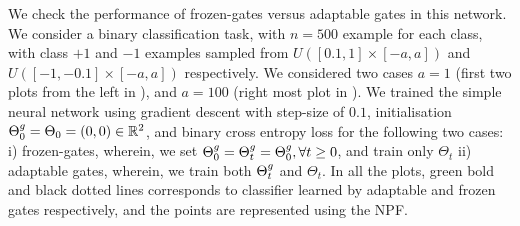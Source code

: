 We check the performance of frozen-gates versus adaptable gates in this network. We consider a binary classification task, with $n=500$ example for each class, with class $+1$ and $-1$ examples sampled from $U([0.1,1]\times [-a,a])$ and $U([-1,-0.1]\times[-a,a])$ respectively. We considered two cases $a=1$ (first two plots from the left in ), and $a=100$ (right most plot in ). 
We trained the simple neural network using gradient descent with step-size of $0.1$, initialisation ${\Theta}^g_0=\Theta_0=(0,0)\in\mathbb{R}^2$, and binary cross entropy loss for the following two cases: i) frozen-gates, wherein, we set ${\Theta}^g_0={\Theta}^g_t={\Theta}^g_0,\forall t\geq 0$, and train only $\Theta_t$ ii) adaptable gates, wherein, we train both ${\Theta}^g_t$ and $\Theta_t$. In all the plots, green bold and black dotted lines corresponds to classifier learned  by adaptable and frozen gates respectively, and the points are represented using the NPF.
\FloatBarrier
